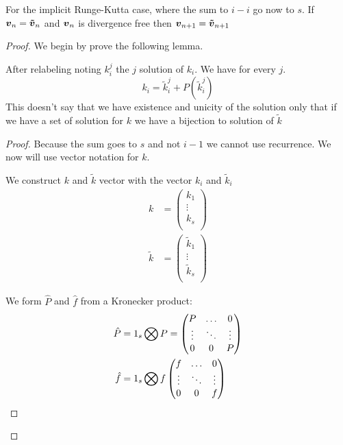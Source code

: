 \begin{theorem}
For the implicit Runge-Kutta case, where the sum to $i-i$ go now to $s$.
If ${\boldsymbol {v}}_{n}={\boldsymbol {\tilde{v}}}_{n}$ and ${\boldsymbol {v}}_n$ is divergence free then ${\boldsymbol {v}}_{n+1}={\boldsymbol {\tilde{v}}}_{n+1}$ 
\end{theorem}
\begin{proof}
We begin by prove the following lemma.
\begin{lemma}
After relabeling noting $k_{i}^{j}$ the $j$ solution of $k_{i}$.
We have for every $j$.
\begin{equation}
  k_{i}=\tilde{k}_{i}^{j}+P(\tilde{k}_{i}^{j})
\end{equation}
This doesn't say that we have existence and unicity of the solution only that if we have a set of solution for $k$ we have a bijection
to solution of $\tilde{k}$
\end{lemma}
\begin{proof}
Because the sum goes to $s$ and not $i-1$ we cannot use recurrence.
We now will use vector notation for $k$.

We construct $k$ and $\tilde{k}$ vector with the vector $k_{i}$ and $\tilde{k}_{i}$
\begin{align}
k&=\begin{pmatrix}
    k_{1}\\
    \vdots\\
    k_{s}\\
  \end{pmatrix}\\
\tilde{k}&=\begin{pmatrix}
    \tilde{k}_{1}\\
    \vdots\\
    \tilde{k}_{s}\\
  \end{pmatrix}
\end{align}

We form $\hat{P}$ and $\hat{f}$ from a Kronecker product:
\begin{align}
\hat{P}&=1_{s}\bigotimes P=\begin{pmatrix}P	&\ldots	&0\\
			\vdots &\ddots 	&\vdots\\
			0	&0	&P\\
	\end{pmatrix}\\
\hat{f}&=1_{s}\bigotimes f\begin{pmatrix}f	&\ldots	&0\\
			\vdots &\ddots 	&\vdots\\
			0	&0	&f\\
	\end{pmatrix}
\end{align}


\end{proof}
\end{proof}
